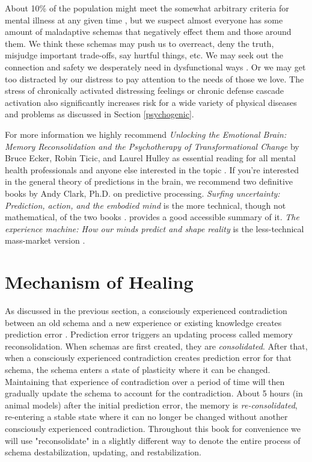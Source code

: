 \documentclass[12pt,letterpaper]{book}
\begin{document}
About 10\% of the population might meet the somewhat arbitrary criteria for mental illness at any given time \cite{whoMentalHealth}, but we suspect almost everyone has some amount of maladaptive schemas that negatively effect them and those around them. We think these schemas may push us to overreact, deny the truth, misjudge important trade-offs, say hurtful things, etc. We may seek out the connection and safety we desperately need in dysfunctional ways \cite{brownAttachmentDisturbances}. Or we may get too distracted by our distress to pay attention to the needs of those we love. The stress of chronically activated distressing feelings or chronic defense cascade activation also significantly increases risk for a wide variety of physical diseases and problems as discussed in Section \ref{psychogenic}.

For more information we highly recommend \textit{Unlocking the Emotional Brain: Memory Reconsolidation and the Psychotherapy of Transformational Change} by Bruce Ecker, Robin Ticic, and Laurel Hulley as essential reading for all mental health professionals and anyone else interested in the topic \cite{eckerUnlocking}. If you're interested in the general theory of predictions in the brain, we recommend two definitive books by Andy Clark, Ph.D. on predictive processing. \textit{Surfing uncertainty: Prediction, action, and the embodied mind} is the more technical, though not mathematical, of the two books \cite{clark2015surfing}. \textcite{alexanderSurfing} provides a good accessible summary of it. \textit{The experience machine: How our minds predict and shape reality} is the less-technical mass-market version \cite{clark2024experience}.

\section{Mechanism of Healing} \label{sec:mechanism}
As discussed in the previous section, a consciously experienced contradiction between an old schema and a new experience or existing knowledge creates prediction error \cite{eckerUnlocking}. Prediction error triggers an updating process called memory reconsolidation. When schemas are first created, they are \textit{consolidated}. After that, when a consciously experienced contradiction creates prediction error for that schema, the schema enters a state of plasticity where it can be changed. Maintaining that experience of contradiction over a period of time will then gradually update the schema to account for the contradiction. About 5 hours (in animal models) after the initial prediction error, the memory is \textit{re-consolidated}, re-entering a stable state where it can no longer be changed without another consciously experienced contradiction. Throughout this book for convenience we will use "reconsolidate" in a slightly different way to denote the entire process of schema destabilization, updating, and restabilization.
\end{document}

